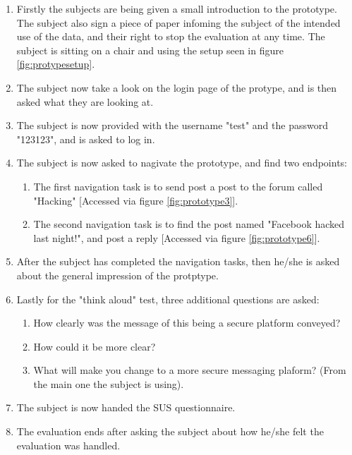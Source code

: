 \begin{mdframed}[linewidth=0pt,backgroundcolor=lightgray!20,innertopmargin = 0.5cm,innerbottommargin = 0.5cm]
    \begin{enumerate}
        \item Firstly the subjects are being given a small introduction to the prototype. The subject also sign a piece of paper infoming the subject of the intended use of the data, and their right to stop the evaluation at any time. The subject is sitting on a chair and using the setup seen in figure \ref{fig:protypesetup}.
        \item The subject now take a look on the login page of the protype, and is then asked what they are looking at.
        \item The subject is now provided with the username "test" and the password "123123", and is asked to log in.
        \item The subject is now asked to nagivate the prototype, and find two endpoints:
        \begin{enumerate}
            \item The first navigation task is to send post a post to the forum called "Hacking" [Accessed via figure \ref{fig:prototype3}].
            \item The second navigation task is to find the post named "Facebook hacked last night!", and post a reply [Accessed via figure \ref{fig:prototype6}].
        \end{enumerate}
        \item After the subject has completed the navigation tasks, then he/she is asked about the general impression of the protptype.
        \item Lastly for the "think aloud" test, three additional questions are asked:
        \begin{enumerate}
            \item How clearly was the message of this being a secure platform conveyed?
            \item How could it be more clear?
            \item What will make you change to a more secure messaging plaform? (From the main one the subject is using).
        \end{enumerate}
        \item The subject is now handed the SUS questionnaire.
        \item The evaluation ends after asking the subject about how he/she felt the evaluation was handled.
    \end{enumerate}
\end{mdframed}

